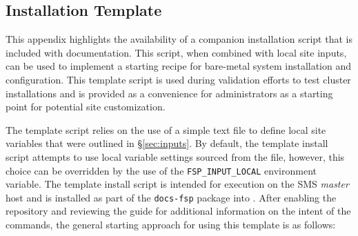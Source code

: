 \subsection{Installation Template}  \label{appendix:template_script}

This appendix highlights the availability of a companion installation script
that is included with \OHPC{} documentation.  This script, when combined with
local site inputs, can be used to implement a starting recipe for
bare-metal system installation and configuration. This template script is used
during validation efforts to test cluster installations and is provided as a
convenience for administrators as a starting point for potential site
customization. 

The template script relies on the use of a simple text file to
define local site variables that were outlined in \S\ref{sec:inputs}.
By default, the template install script attempts to use local variable settings
sourced from the  file,
however, this choice can be overridden by the use of the
\texttt{FSP\_INPUT\_LOCAL} environment variable. The template install script is
intended for execution on the SMS {\em master} host and is installed as part of
the \texttt{docs-fsp} package into .
After enabling the \OHPC{} repository and reviewing the guide for additional information on the intent of the
commands, the general starting approach for using this template is as follows:

